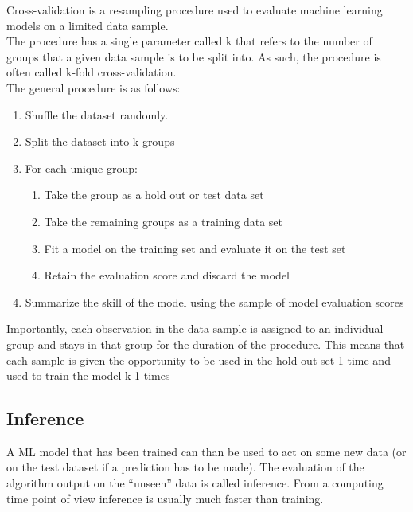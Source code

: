 \begin{tcolorbox}[width=\textwidth,colback={white},title={\textbf{25.} What are k-folding and cross-validation?
		
		
		
	},colbacktitle=red,coltitle=black]

	Cross-validation is a resampling procedure used to evaluate machine learning models on a limited data sample.\\
	The procedure has a single parameter called k that refers to the number of groups that a given data sample is to be split into. As such, the procedure is often called k-fold cross-validation.\\
	The general procedure is as follows:
	\begin{enumerate}
		 
	
	\item Shuffle the dataset randomly.
	\item Split the dataset into k groups
	\item For each unique group:
	\begin{enumerate}
		 
	\item Take the group as a hold out or test data set
	\item Take the remaining groups as a training data set
	\item Fit a model on the training set and evaluate it on the test set
	\item Retain the evaluation score and discard the model
	\end{enumerate}
	\item Summarize the skill of the model using the sample of model evaluation scores
	\end{enumerate}
	
	Importantly, each observation in the data sample is assigned to an individual group and stays in that group for the duration of the procedure. This means that each sample is given the opportunity to be used in the hold out set 1 time and used to train the model k-1 times
	
	
	
\end{tcolorbox}

\subsection{Inference}

A ML model that has been trained can than be used to act on some new data (or on the test dataset if a prediction has to be made).
The evaluation of the algorithm output on the “unseen” data is called inference. From a computing time point of view inference is usually much faster than training.


